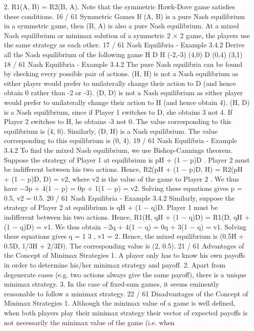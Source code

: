 2. R1(A, B) = R2(B, A).
Note that the symmetric Hawk-Dove game satisfies these
conditions.
16 / 61
Symmetric Games
If (A, B) is a pure Nash equilibrium in a symmetric game, then
(B, A) is also a pure Nash equilibrium.
At a mixed Nash equilibrium or minimax solution of a symmetric
2 × 2 game, the players use the same strategy as each other.
17 / 61
Nash Equilibria - Example 3.4.2
Derive all the Nash equilibrium of the following game
H D
H (-2,-3) (4,0)
D (0,4) (3,1)
18 / 61
Nash Equilibria - Example 3.4.2
The pure Nash equilibria can be found by checking every possible
pair of actions.
(H, H) is not a Nash equilibrium as either player would prefer to
unilaterally change their action to D (and hence obtain 0 rather
than -2 or -3).
(D, D) is not a Nash equilibrium as either player would prefer to
unilaterally change their action to H (and hence obtain 4).
(H, D) is a Nash equilibrium, since if Player 1 switches to D, she
obtains 3 not 4. If Player 2 switches to H, he obtains -3 not 0.
The value corresponding to this equilibrium is (4, 0).
Similarly, (D, H) is a Nash equilibrium. The value corresponding to
this equilibrium is (0, 4).
19 / 61
Nash Equilibria - Example 3.4.2
To find the mixed Nash equilibrium, we use Bishop-Cannings
theorem. Suppose the strategy of Player 1 at equilibrium is
pH + (1 − p)D . Player 2 must be indifferent between his two
actions. Hence,
R2(pH + (1 − p)D, H) = R2(pH + (1 − p)D, D) = v2,
where v2 is the value of the game to Player 2 .
We thus have −3p + 4(1 − p) = 0p + 1(1 − p) = v2. Solving these
equations gives p = 0.5, v2 = 0.5.
20 / 61
Nash Equilibria - Example 3.4.2
Similarly, suppose the strategy of Player 2 at equilibrium is
qH + (1 − q)D. Player 1 must be indifferent between his two
actions. Hence,
R1(H, qH + (1 − q)D) = R1(D, qH + (1 − q)D) = v1.
We thus obtain −2q + 4(1 − q) = 0q + 3(1 − q) = v1. Solving
these equations gives q =
1
3
, v1 = 2.
Hence, the mixed equilibrium is (0.5H + 0.5D, 1/3H + 2/3D). The
corresponding value is (2, 0.5).
21 / 61
Advantages of the Concept of Minimax Strategies
1. A player only has to know his own payoffs in order to
determine his/her minimax strategy and payoff.
2. Apart from degenerate cases (e.g. two actions always
give the same payoff), there is a unique minimax
strategy.
3. In the case of fixed-sum games, it seems eminently
reasonable to follow a minimax strategy.
22 / 61
Disadvantages of the Concept of Minimax Strategies
1. Although the minimax value of a game is well
defined, when both players play their minimax
strategy their vector of expected payoffs is not
necessarily the minimax value of the game (i.e. when

